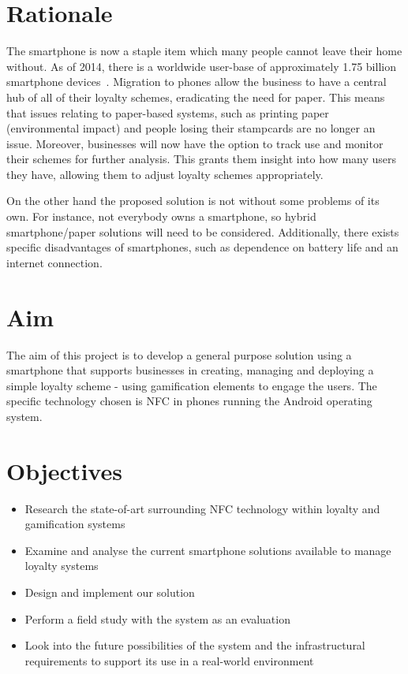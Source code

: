 \section{Rationale}
The smartphone is now a staple item which many people cannot leave their home without. As of 2014, there is a worldwide user-base of approximately 1.75 billion smartphone devices~\cite{smartUsers}. Migration to phones allow the business to have a central hub of all of their loyalty schemes, eradicating the need for paper. This means that issues relating to paper-based systems, such as printing paper (environmental impact) and people losing their stampcards are no longer an issue. Moreover, businesses will now have the option to track use and monitor their schemes for further analysis. This grants them insight into how many users they have, allowing them to adjust loyalty schemes appropriately.

On the other hand the proposed solution is not without some problems of its own. For instance, not everybody owns a smartphone, so hybrid smartphone/paper solutions will need to be considered. Additionally, there exists specific disadvantages of smartphones, such as dependence on battery life and an internet connection.

\section{Aim}
The aim of this project is to develop a general purpose solution using a smartphone that supports businesses in creating, managing and deploying a simple loyalty scheme - using gamification elements to engage the users. The specific technology chosen is NFC in phones running the Android operating system. 

\section{Objectives}
\label{sec:objectives}
\begin{itemize}
    \item Research the state-of-art surrounding NFC technology within loyalty and gamification systems
    \item Examine and analyse the current smartphone solutions available to manage loyalty systems
    \item Design and implement our solution
    \item Perform a field study with the system as an evaluation
    \item Look into the future possibilities of the system and the infrastructural requirements to support its use in a real-world environment
\end{itemize}

